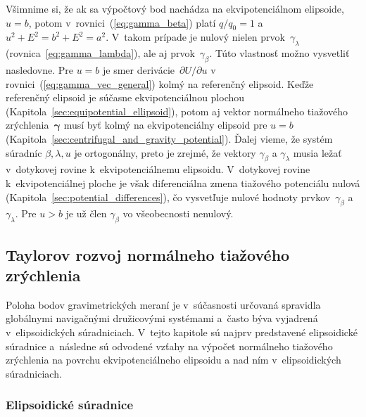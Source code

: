 \documentclass[a4paper,12pt]{book}
\begin{document}
Všimnime si, že ak sa výpočtový bod nachádza na ekvipotenciálnom elipsoide, $u 
= b$, potom v~rovnici~(\ref{eq:gamma_beta}) platí $q \slash q_0 = 1$ a $u^2 
+ E^2 = b^2 + E^2 = a^2$. V~takom prípade je nulový nielen 
prvok~$\gamma_\lambda$ (rovnica~\ref{eq:gamma_lambda}), ale aj 
prvok~$\gamma_\beta$.  Túto vlastnosť možno vysvetliť nasledovne.  Pre $u = b$ 
je smer derivácie~$\partial U \slash \partial u$ 
v rovnici~(\ref{eq:gamma_vec_general}) kolmý na referenčný elipsoid.  Keďže 
referenčný elipsoid je súčasne ekvipotenciálnou plochou 
(Kapitola~\ref{sec:equipotential_ellipsoid}), potom aj vektor normálneho 
tiažového zrýchlenia~$\boldsymbol \gamma$ musí byť kolmý na ekvipotenciálny 
elipsoid pre $u = b$ (Kapitola~\ref{sec:centrifugal_and_gravity_potential}).  
Ďalej vieme, že systém súradníc $\beta, \lambda, u$ je ortogonálny, preto je 
zrejmé, že vektory $\gamma_\beta$ a $\gamma_\lambda$ musia ležať v~dotykovej 
rovine k~ekvipotenciálnemu elipsoidu.  V~dotykovej rovine k~ekvipotenciálnej 
ploche je však diferenciálna zmena tiažového potenciálu nulová 
(Kapitola~\ref{sec:potential_differences}), čo vysvetľuje nulové hodnoty 
prvkov~$\gamma_\beta$ a~$\gamma_\lambda$.  Pre $u > b$ je už člen 
$\gamma_\beta$ vo všeobecnosti nenulový.



\subsection{Taylorov rozvoj normálneho tiažového zrýchlenia}
\label{sec:normal_gravity_taylor}

Poloha bodov gravimetrických meraní je v~súčasnosti určovaná spravidla 
globálnymi navigačnými družicovými systémami a~často býva vyjadrená 
v~elipsoidických súradniciach.  V~tejto kapitole sú najprv predstavené 
elipsoidické súradnice a~následne sú odvodené vzťahy na výpočet normálneho 
tiažového zrýchlenia na povrchu ekvipotenciálneho elipsoidu a nad ním 
v~elipsoidických súradniciach.

\subsubsection{Elipsoidické súradnice}
\end{document}
